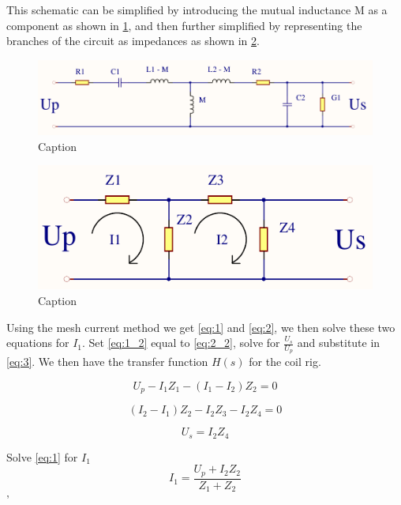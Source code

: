 This schematic can be simplified by introducing the mutual inductance M as a component as shown in \cref{fig:spolerigg2}, and then further simplified by representing the branches of the circuit as impedances as shown in \cref{fig:spolerigg3}.

\begin{figure}[h!]
    \centering
    \includegraphics[width=\textwidth]{Skjema/Spolerigg2.pdf}
    \caption{Caption}
    \label{fig:spolerigg2}
\end{figure}

\begin{figure}[h!]
    \centering
    \includegraphics[width=\textwidth]{Skjema/Spolerigg3.pdf}
    \caption{Caption}
    \label{fig:spolerigg3}
\end{figure}

Using the mesh current method we get \cref{eq:1} and \cref{eq:2}, we then solve these two equations for $I_1$. Set \cref{eq:1_2} equal to \cref{eq:2_2}, solve for $\frac{U_s}{U_p}$ and substitute in \cref{eq:3}. We then have the transfer function $H(s)$ for the coil rig.

\begin{equation} \label{eq:1}
    U_p - I_1 Z_1 - (I_1 - I_2) Z_2 = 0
\end{equation}

\begin{equation} \label{eq:2}
    (I_2 - I_1) Z_2 - I_2 Z_3 - I_2 Z_4 = 0
\end{equation}

\begin{equation} \label{eq:3}
    U_s = I_2 Z_4
\end{equation}

Solve \cref{eq:1} for $I_1$
\begin{equation} \label{eq:1_2}
    I_1 = \frac{U_p + I_2 Z_2}{Z_1 + Z_2}
\end{equation}'

